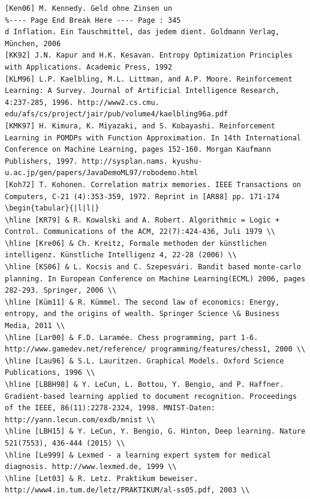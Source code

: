 \documentclass[10pt]{article}
\begin{document}
\begin{verbatim}
[Ken06] M. Kennedy. Geld ohne Zinsen un
%---- Page End Break Here ---- Page : 345
d Inflation. Ein Tauschmittel, das jedem dient. Goldmann Verlag, München, 2006
[KK92] J.N. Kapur and H.K. Kesavan. Entropy Optimization Principles with Applications. Academic Press, 1992
[KLM96] L.P. Kaelbling, M.L. Littman, and A.P. Moore. Reinforcement Learning: A Survey. Journal of Artificial Intelligence Research, 4:237-285, 1996. http://www2.cs.cmu. edu/afs/cs/project/jair/pub/volume4/kaelbling96a.pdf
[KMK97] H. Kimura, K. Miyazaki, and S. Kobayashi. Reinforcement Learning in POMDPs with Function Approximation. In 14th International Conference on Machine Learning, pages 152-160. Morgan Kaufmann Publishers, 1997. http://sysplan.nams. kyushu-u.ac.jp/gen/papers/JavaDemoML97/robodemo.html
[Koh72] T. Kohonen. Correlation matrix memories. IEEE Transactions on Computers, C-21 (4):353-359, 1972. Reprint in [AR88] pp. 171-174
\begin{tabular}{|l|l|}
\hline [KR79] & R. Kowalski and A. Robert. Algorithmic = Logic + Control. Communications of the ACM, 22(7):424-436, Juli 1979 \\
\hline [Kre06] & Ch. Kreitz, Formale methoden der künstlichen intelligenz. Künstliche Intelligenz 4, 22-28 (2006) \\
\hline [KS06] & L. Kocsis and C. Szepesvári. Bandit based monte-carlo planning. In European Conference on Machine Learning(ECML) 2006, pages 282-293. Springer, 2006 \\
\hline [Küm11] & R. Kümmel. The second law of economics: Energy, entropy, and the origins of wealth. Springer Science \& Business Media, 2011 \\
\hline [Lar00] & F.D. Laramée. Chess programming, part 1-6. http://www.gamedev.net/reference/ programming/features/chess1, 2000 \\
\hline [Lau96] & S.L. Lauritzen. Graphical Models. Oxford Science Publications, 1996 \\
\hline [LBBH98] & Y. LeCun, L. Bottou, Y. Bengio, and P. Haffner. Gradient-based learning applied to document recognition. Proceedings of the IEEE, 86(11):2278-2324, 1998. MNIST-Daten: http://yann.lecun.com/exdb/mnist \\
\hline [LBH15] & Y. LeCun, Y. Bengio, G. Hinton, Deep learning. Nature 521(7553), 436-444 (2015) \\
\hline [Le999] & Lexmed - a learning expert system for medical diagnosis. http://www.lexmed.de, 1999 \\
\hline [Let03] & R. Letz. Praktikum beweiser. http://www4.in.tum.de/letz/PRAKTIKUM/al-ss05.pdf, 2003 \\

\end{verbatim}
\end{document}

